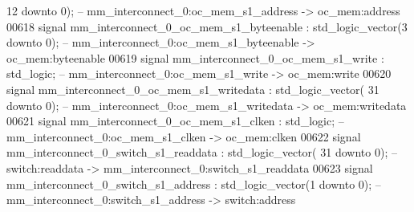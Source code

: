 \begin{DoxyCode}
{      12} \textcolor{keywordflow}{downto} \textcolor{vhdllogic}{}\textcolor{vhdllogic}{0}\textcolor{vhdlchar}{)};\textcolor{keyword}{ -- mm\_interconnect\_0:oc\_mem\_s1\_address -> oc\_mem:address}
00618     \textcolor{keywordflow}{signal} \textcolor{vhdlchar}{mm_interconnect_0_oc_mem_s1_byteenable}                                      \textcolor{vhdlchar}{:} \textcolor{comment}{std\_logic\_vector}\textcolor{vhdlchar}{(}\textcolor{vhdllogic}{}\textcolor{vhdllogic}{3}
       \textcolor{keywordflow}{downto} \textcolor{vhdllogic}{}\textcolor{vhdllogic}{0}\textcolor{vhdlchar}{)};\textcolor{keyword}{  -- mm\_interconnect\_0:oc\_mem\_s1\_byteenable -> oc\_mem:byteenable}
00619     \textcolor{keywordflow}{signal} \textcolor{vhdlchar}{mm_interconnect_0_oc_mem_s1_write}                                           \textcolor{vhdlchar}{:} \textcolor{comment}{std\_logic};\textcolor{keyword}{        
                   -- mm\_interconnect\_0:oc\_mem\_s1\_write -> oc\_mem:write}
00620     \textcolor{keywordflow}{signal} \textcolor{vhdlchar}{mm_interconnect_0_oc_mem_s1_writedata}                                       \textcolor{vhdlchar}{:} \textcolor{comment}{std\_logic\_vector}\textcolor{vhdlchar}{(}\textcolor{vhdllogic}{}\textcolor{vhdllogic}{
      31} \textcolor{keywordflow}{downto} \textcolor{vhdllogic}{}\textcolor{vhdllogic}{0}\textcolor{vhdlchar}{)};\textcolor{keyword}{ -- mm\_interconnect\_0:oc\_mem\_s1\_writedata -> oc\_mem:writedata}
00621     \textcolor{keywordflow}{signal} \textcolor{vhdlchar}{mm_interconnect_0_oc_mem_s1_clken}                                           \textcolor{vhdlchar}{:} \textcolor{comment}{std\_logic};\textcolor{keyword}{        
                   -- mm\_interconnect\_0:oc\_mem\_s1\_clken -> oc\_mem:clken}
00622     \textcolor{keywordflow}{signal} \textcolor{vhdlchar}{mm_interconnect_0_switch_s1_readdata}                                        \textcolor{vhdlchar}{:} \textcolor{comment}{std\_logic\_vector}\textcolor{vhdlchar}{(}\textcolor{vhdllogic}{}\textcolor{vhdllogic}{
      31} \textcolor{keywordflow}{downto} \textcolor{vhdllogic}{}\textcolor{vhdllogic}{0}\textcolor{vhdlchar}{)};\textcolor{keyword}{ -- switch:readdata -> mm\_interconnect\_0:switch\_s1\_readdata}
00623     \textcolor{keywordflow}{signal} \textcolor{vhdlchar}{mm_interconnect_0_switch_s1_address}                                         \textcolor{vhdlchar}{:} \textcolor{comment}{std\_logic\_vector}\textcolor{vhdlchar}{(}\textcolor{vhdllogic}{}\textcolor{vhdllogic}{1}
       \textcolor{keywordflow}{downto} \textcolor{vhdllogic}{}\textcolor{vhdllogic}{0}\textcolor{vhdlchar}{)};\textcolor{keyword}{  -- mm\_interconnect\_0:switch\_s1\_address -> switch:address}

\end{DoxyCode}
